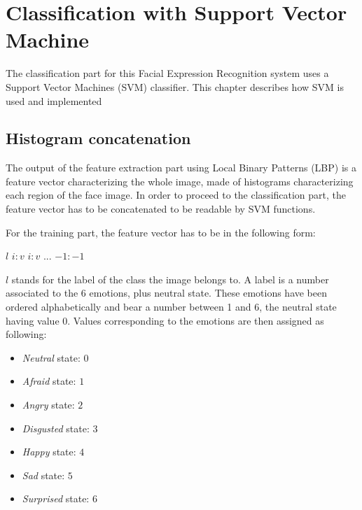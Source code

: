 \chapter{Classification with Support Vector Machine}
\label{chap:implementation_svm}

\noindent The classification part for this Facial Expression Recognition system uses a Support Vector Machines (SVM) classifier. This chapter describes how SVM is used and implemented
\newline

\section{Histogram concatenation}

\vspace{\baselineskip}
\noindent The output of the feature extraction part using Local Binary Patterns (LBP) is a feature vector characterizing the whole image, made of histograms characterizing each region of the face image. In order to proceed to the classification part, the feature vector has to be concatenated to be readable by SVM functions.
\newline

\noindent For the training part, the feature vector has to be in the following form:
\begin{center}
\noindent $ l $ \hspace{0.7cm} $ i:v $ \hspace{0.2cm} $ i:v $ \hspace{0.2cm} $ ... $ \hspace{0.2cm} $ -1:-1 $
\end{center} 
\noindent $ l $ stands for the label of the class the image belongs to. A label is a number associated to the 6 emotions, plus neutral state. These emotions have been ordered alphabetically and bear a number between 1 and 6, the neutral state having value 0. Values corresponding to the emotions are then assigned as following:

\begin{itemize}
	\item \textit{Neutral} state: $ 0 $
	\item \textit{Afraid} state: $ 1 $
	\item \textit{Angry} state: $ 2 $
	\item \textit{Disgusted} state: $ 3 $
	\item \textit{Happy} state: $ 4 $
	\item \textit{Sad} state: $ 5 $
	\item \textit{Surprised} state: $ 6 $
\end{itemize}

